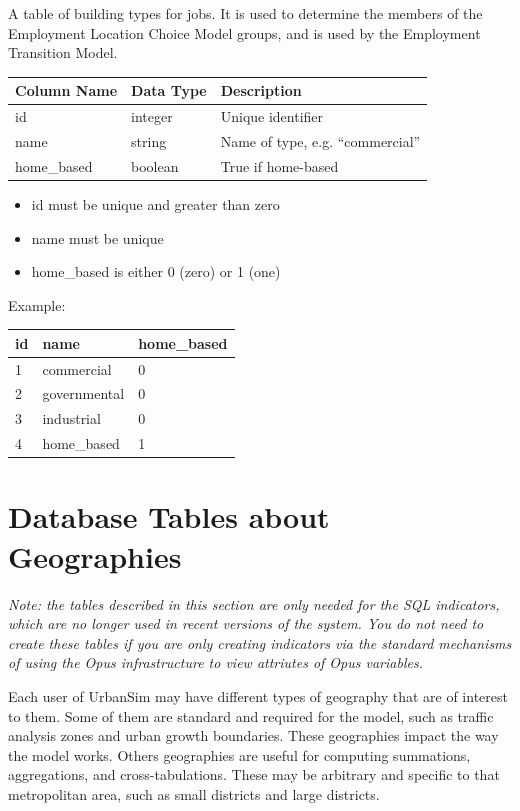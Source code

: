 A table of building types for jobs.  It is used to determine the members
of the Employment Location Choice Model groups, and is used by the Employment
Transition Model.

\begin{tabular}{|l|l|l|}
\hline
\textbf{Column Name} & \textbf{Data Type} & \textbf{Description} \\
\hline
id & integer & Unique identifier  \\
\hline
name & string & Name of type, e.g. ``commercial''  \\ \hline
home_based & boolean & True if home-based  \\
\hline
\end{tabular}

\begin{itemize} \tight
\item id must be unique and greater than zero
\item name must be unique
\item home_based is either 0 (zero) or 1 (one)
\end{itemize}

Example:\\[2mm]
\begin{tabular}{|l|l|l|}
\hline
id & name & home_based \\\hline
1 & commercial & 0 \\\hline
2 & governmental & 0  \\\hline
3 & industrial & 0 \\\hline
4 & home_based & 1 \\\hline
\end{tabular}


\section{Database Tables about Geographies}

\emph{Note: the tables described in this section are only needed for the SQL
indicators, which are no longer used in recent versions of the system. You do not need to create
these tables if you are only creating indicators via the standard mechanisms of
using the Opus infrastructure to view attriutes of Opus variables.}

Each user of UrbanSim may have different types of geography that are of
interest to them. Some of them are standard and required for the model, such as
traffic analysis zones and urban growth boundaries. These geographies
impact the way the model works. Others geographies are useful for
computing summations, aggregations, and cross-tabulations. These may be
arbitrary and specific to that metropolitan area, such as small districts and
large districts.

